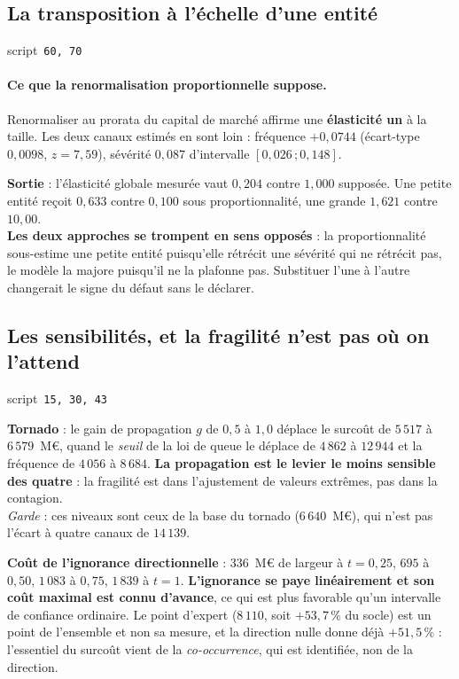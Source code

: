 \documentclass[11pt,a4paper]{article}
\newcommand{\src}[1]{\hfill{\footnotesize\textsf{script~\texttt{#1}}}}
\begin{document}
\subsection*{La transposition à l'échelle d'une entité}
\src{\texttt{60}, \texttt{70}}

\paragraph{Ce que la renormalisation proportionnelle suppose.} Renormaliser au prorata du capital
de marché affirme une \textbf{élasticité un} à la taille. Les deux canaux estimés en sont loin :
fréquence $+0{,}0744$ (écart-type $0{,}0098$, $z = 7{,}59$), sévérité $0{,}087$ d'intervalle
$[0{,}026\,;0{,}148]$.

\begin{res}
\textbf{Sortie} : l'élasticité globale mesurée vaut $0{,}204$ contre $1{,}000$ supposée. Une
petite entité reçoit $0{,}633$ contre $0{,}100$ sous proportionnalité, une grande $1{,}621$ contre
$10{,}00$.\\
\textbf{Les deux approches se trompent en sens opposés} : la proportionnalité sous-estime une
petite entité puisqu'elle rétrécit une sévérité qui ne rétrécit pas, le modèle la majore puisqu'il
ne la plafonne pas. Substituer l'une à l'autre changerait le signe du défaut sans le déclarer.
\end{res}

\subsection*{Les sensibilités, et la fragilité n'est pas où on l'attend}
\src{\texttt{15}, \texttt{30}, \texttt{43}}

\begin{res}
\textbf{Tornado} : le gain de propagation $g$ de $0{,}5$ à $1{,}0$ déplace le surcoût de
$5\,517$ à $6\,579$~M\euro, quand le \emph{seuil} de la loi de queue le déplace de $4\,862$ à
$12\,944$ et la fréquence de $4\,056$ à $8\,684$. \textbf{La propagation est le levier le moins
sensible des quatre} : la fragilité est dans l'ajustement de valeurs extrêmes, pas dans la
contagion.\\
\emph{Garde} : ces niveaux sont ceux de la base du tornado ($6\,640$~M\euro), qui n'est pas
l'écart à quatre canaux de $14\,139$.
\end{res}

\begin{res}
\textbf{Coût de l'ignorance directionnelle} : $336$~M\euro{} de largeur à $t = 0{,}25$, $695$ à
$0{,}50$, $1\,083$ à $0{,}75$, $1\,839$ à $t = 1$. \textbf{L'ignorance se paye linéairement et son
coût maximal est connu d'avance}, ce qui est plus favorable qu'un intervalle de confiance
ordinaire. Le point d'expert ($8\,110$, soit $+53{,}7\,\%$ du socle) est un point de l'ensemble et
non sa mesure, et la direction nulle donne déjà $+51{,}5\,\%$ : l'essentiel du surcoût vient de la
\emph{co-occurrence}, qui est identifiée, non de la direction.
\end{res}
\end{document}
